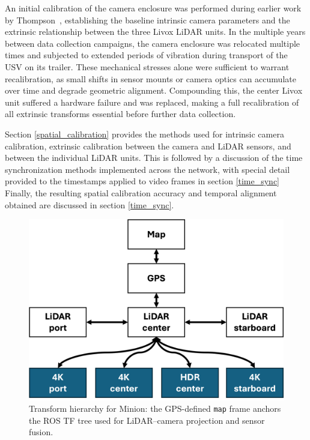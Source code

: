 \documentclass[../main.tex]{subfiles}
\begin{document}

An initial calibration of the camera enclosure was performed during earlier work by Thompson~\cite{thompson2023}, establishing the baseline intrinsic camera parameters and the extrinsic relationship between the three Livox LiDAR units.
In the multiple years between data collection campaigns, the camera enclosure was relocated multiple times and subjected to extended periods of vibration during transport of the \ac{USV} on its trailer.
These mechanical stresses alone were sufficient to warrant recalibration, as small shifts in sensor mounts or camera optics can accumulate over time and degrade geometric alignment.
Compounding this, the center Livox unit suffered a hardware failure and was replaced, making a full recalibration of all extrinsic transforms essential before further data collection.

Section \ref{spatial_calibration} provides the methods used for intrinsic camera calibration, extrinsic calibration between the camera and LiDAR sensors, and between the individual LiDAR units. 
This is followed by a discussion of the time synchronization methods implemented across the network, with special detail provided to the timestamps applied to video frames in section \ref{time_sync}
Finally, the resulting spatial calibration accuracy and temporal alignment obtained are discussed in section \ref{time_sync}.



\begin{figure}[htbp]
    \centering
    \includegraphics[width=0.7\linewidth]{Images/tf_tree_1.png}
    \caption{Transform hierarchy for Minion: the GPS-defined \texttt{map} frame anchors the ROS TF tree used for LiDAR–camera projection and sensor fusion.}
    \label{fig:tf_tree}
\end{figure}
\end{document}
